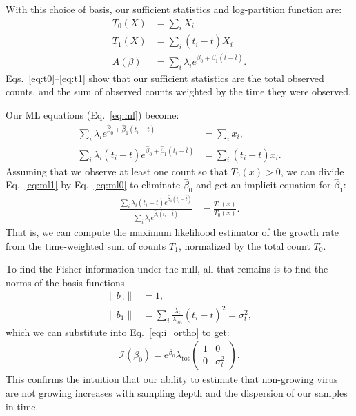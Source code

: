 \documentclass[12pt, letterpaper]{article}
\newcommand{ \lambtot }{\lambda_{\text{tot}}}
\begin{document}
With this choice of basis, our sufficient statistics and log-partition function are:
\begin{align}
    T_0(X) &= \sum_i X_i \label{eq:t0} \\
    T_1(X) &= \sum_i (t_i - \bar{t}) X_i \label{eq:t1} \\
    A(\beta) &= \sum_i \lambda_i e^{\beta_0 + \beta_1 (t - \bar{t})}.
\end{align}
Eqs.~\ref{eq:t0}--\ref{eq:t1} show that our sufficient statistics are the total observed counts, and the sum of observed counts weighted by the time they were observed.

Our ML equations (Eq.~\ref{eq:ml}) become:
\begin{align}
    \sum_i \lambda_i e^{\hat{\beta}_0 + \hat{\beta}_1 (t_i - \bar{t})} &= \sum_i x_i, \label{eq:ml0} \\
    \sum_i \lambda_i (t_i - \bar{t}) e^{\hat{\beta}_0 + \hat{\beta}_1 (t_i - \bar{t})} &= \sum_i (t_i - \bar{t}) x_i. \label{eq:ml1}
\end{align}
Assuming that we observe at least one count so that $T_0(x) > 0$, we can divide Eq.~\ref{eq:ml1} by Eq.~\ref{eq:ml0} to eliminate $\hat{\beta}_0$ and get an implicit equation for $\hat{\beta}_1$:
\begin{align}
    \frac{\sum_i \lambda_i (t_i - \bar{t}) e^{\hat{\beta}_1 (t_i - \bar{t})}}{\sum_i \lambda_i e^{\hat{\beta}_1 (t_i - \bar{t})}}
    &= \frac{T_1(x)}{T_0(x)}.
    \label{eq:ml_ratio}
\end{align}
That is, we can compute the maximum likelihood estimator of the growth rate from the time-weighted sum of counts $T_1$, normalized by the total count $T_0$.

To find the Fisher information under the null, all that remains is to find the norms of the basis functions
\begin{align}
    \|b_0\| &= 1, \\
    \|b_1\| &= \sum_i \frac{\lambda_i}{\lambtot} {(t_i - \bar{t})}^2 = \sigma_t^2,
\end{align}
which  we can substitute into Eq.~\ref{eq:i_ortho} to get:
\begin{align}
    \mathcal{I}(\beta_0) = e^{\beta_0} \lambtot
    \begin{pmatrix}
        1 & 0 \\
        0 & \sigma_t^2
    \end{pmatrix}.
\end{align}
This confirms the intuition that our ability to estimate that non-growing virus are not growing increases with sampling depth and the dispersion of our samples in time.
\end{document}
